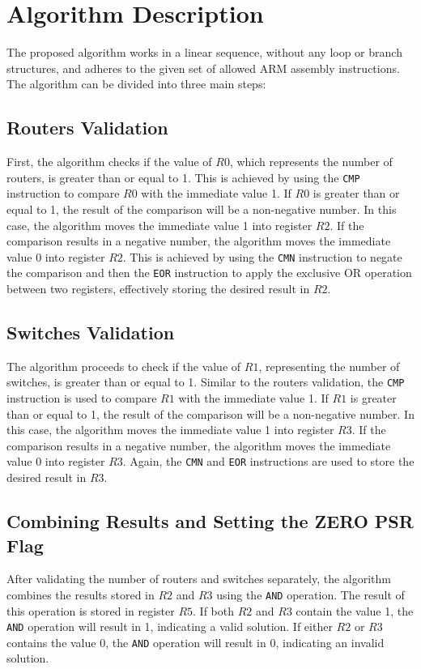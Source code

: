 \section{Algorithm Description}
The proposed algorithm works in a linear sequence, without any loop or branch structures, and adheres to the given set of allowed ARM assembly instructions. The algorithm can be divided into three main steps:

\subsection{Routers Validation}
First, the algorithm checks if the value of $R0$, which represents the number of routers, is greater than or equal to 1. This is achieved by using the \texttt{CMP} instruction to compare $R0$ with the immediate value 1. If $R0$ is greater than or equal to 1, the result of the comparison will be a non-negative number. In this case, the algorithm moves the immediate value 1 into register $R2$. If the comparison results in a negative number, the algorithm moves the immediate value 0 into register $R2$. This is achieved by using the \texttt{CMN} instruction to negate the comparison and then the \texttt{EOR} instruction to apply the exclusive OR operation between two registers, effectively storing the desired result in $R2$. 

\subsection{Switches Validation}
The algorithm proceeds to check if the value of $R1$, representing the number of switches, is greater than or equal to 1. Similar to the routers validation, the \texttt{CMP} instruction is used to compare $R1$ with the immediate value 1. If $R1$ is greater than or equal to 1, the result of the comparison will be a non-negative number. In this case, the algorithm moves the immediate value 1 into register $R3$. If the comparison results in a negative number, the algorithm moves the immediate value 0 into register $R3$. Again, the \texttt{CMN} and \texttt{EOR} instructions are used to store the desired result in $R3$.

\subsection{Combining Results and Setting the ZERO PSR Flag}
After validating the number of routers and switches separately, the algorithm combines the results stored in $R2$ and $R3$ using the \texttt{AND} operation. The result of this operation is stored in register $R5$. If both $R2$ and $R3$ contain the value 1, the \texttt{AND} operation will result in 1, indicating a valid solution. If either $R2$ or $R3$ contains the value 0, the \texttt{AND} operation will result in 0, indicating an invalid solution.

